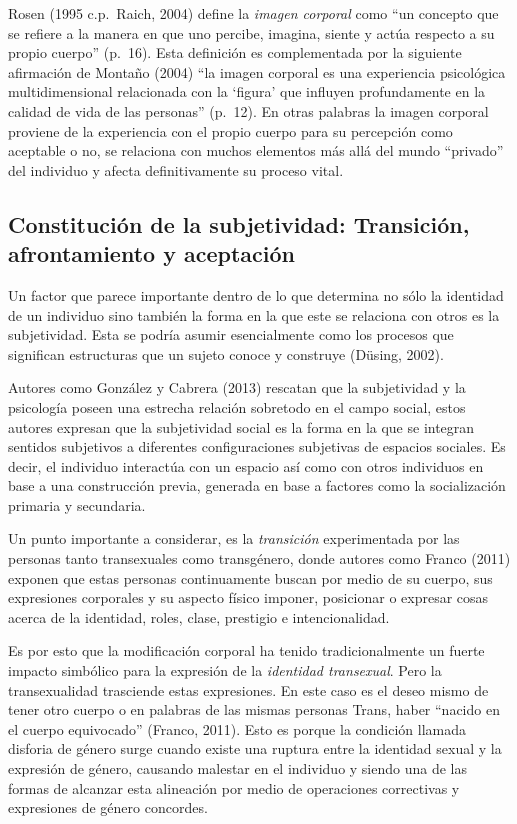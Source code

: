 Rosen (1995 c.p.~Raich, 2004) define la \emph{imagen corporal} como “un concepto que
se refiere a la manera en que uno percibe, imagina, siente y actúa respecto a su
propio cuerpo” (p.~16).
Esta definición es complementada por la siguiente afirmación de Montaño (2004)
“la imagen corporal es una experiencia psicológica multidimensional relacionada
con la ‘figura’ que influyen profundamente en la calidad de vida de las
personas” (p.~12).
En otras palabras la imagen corporal proviene de la experiencia con el propio
cuerpo para su percepción como aceptable o no, se relaciona con muchos elementos
más allá del mundo “privado” del individuo y afecta definitivamente su proceso
vital.

\subsection{Constitución de la subjetividad: Transición, afrontamiento y
aceptación}
Un factor que parece importante dentro de lo que determina no sólo la identidad
de un individuo sino también la forma en la que este se relaciona con otros es
la subjetividad.
Esta se podría asumir esencialmente como los procesos que significan
estructuras que un sujeto conoce y construye (Düsing, 2002).

Autores como González y Cabrera (2013) rescatan que la subjetividad y la
psicología poseen una estrecha relación sobretodo en el campo social, estos
autores expresan que la subjetividad social es la forma en la que se integran
sentidos subjetivos a diferentes configuraciones subjetivas de espacios
sociales.
Es decir, el individuo interactúa con un espacio así como con otros individuos
en base a una construcción previa, generada en base a factores como la
socialización primaria y secundaria.

Un punto importante a considerar, es la \emph{transición} experimentada por las
personas tanto transexuales como transgénero, donde autores como Franco (2011)
exponen que estas personas continuamente buscan por medio de su cuerpo, sus
expresiones corporales y su aspecto físico imponer, posicionar o expresar cosas
acerca de la identidad, roles, clase, prestigio e intencionalidad.

Es por esto que la modificación corporal ha tenido tradicionalmente un fuerte
impacto simbólico para la expresión de la \emph{identidad transexual}.
Pero la transexualidad trasciende estas expresiones.
En este caso es el deseo mismo de tener otro cuerpo o en palabras de las mismas
personas Trans, haber “nacido en el cuerpo equivocado” (Franco, 2011).
Esto es porque la condición llamada disforia de género surge cuando existe una
ruptura entre la identidad sexual y la expresión de género, causando malestar en
el individuo y siendo una de las formas de alcanzar esta alineación por medio de
operaciones correctivas y expresiones de género concordes.

